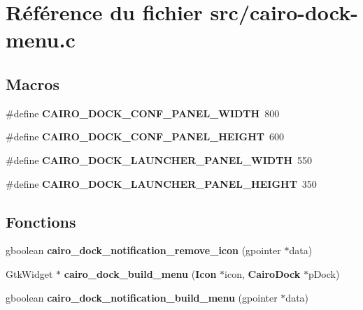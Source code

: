 \section{R\'{e}f\'{e}rence du fichier src/cairo-dock-menu.c}
\label{cairo-dock-menu_8c}
\subsection*{Macros}
\begin{CompactItemize}
\item 
\#define {\bf CAIRO\_\-DOCK\_\-CONF\_\-PANEL\_\-WIDTH}~800
\item 
\#define {\bf CAIRO\_\-DOCK\_\-CONF\_\-PANEL\_\-HEIGHT}~600
\item 
\#define {\bf CAIRO\_\-DOCK\_\-LAUNCHER\_\-PANEL\_\-WIDTH}~550
\item 
\#define {\bf CAIRO\_\-DOCK\_\-LAUNCHER\_\-PANEL\_\-HEIGHT}~350
\end{CompactItemize}
\subsection*{Fonctions}
\begin{CompactItemize}
\item 
gboolean {\bf cairo\_\-dock\_\-notification\_\-remove\_\-icon} (gpointer $\ast$data)
\item 
Gtk\-Widget $\ast$ {\bf cairo\_\-dock\_\-build\_\-menu} ({\bf Icon} $\ast$icon, {\bf Cairo\-Dock} $\ast$p\-Dock)
\item 
gboolean {\bf cairo\_\-dock\_\-notification\_\-build\_\-menu} (gpointer $\ast$data)
\end{CompactItemize}
